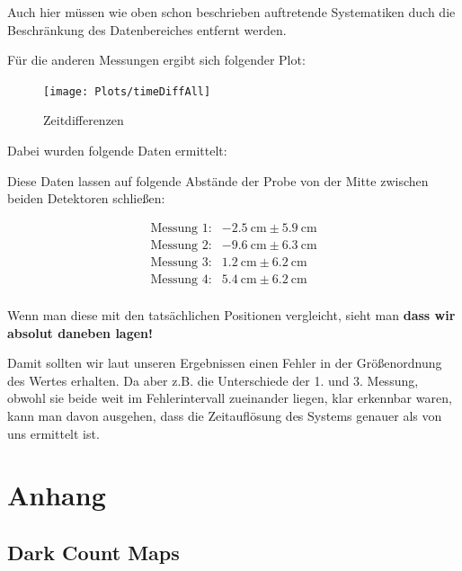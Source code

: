 \documentclass[12pt,twoside,a4paper]{scrartcl}
\begin{document}
					 Auch hier müssen wie oben schon beschrieben auftretende Systematiken duch die Beschränkung des Datenbereiches entfernt werden.

					 Für die anderen Messungen ergibt sich folgender Plot:

					 \begin{figure}[H]
						 \centering
						 \texttt{[image: Plots/timeDiffAll]}
					 	\caption{Zeitdifferenzen}
					 \end{figure}

					 Dabei wurden folgende Daten ermittelt:

					 

					 Diese Daten lassen auf folgende Abstände der Probe von der Mitte zwischen beiden Detektoren schließen:

					 \begin{align*}
					 	\text{Messung 1:}& \SI{-2.5}{\centi \metre} \pm \SI{5.9}{\centi \metre} \\
						\text{Messung 2:}& \SI{-9.6}{\centi \metre} \pm \SI{6.3}{\centi \metre} \\
						\text{Messung 3:}& \SI{1.2}{\centi \metre} \pm \SI{6.2}{\centi \metre} \\
						\text{Messung 4:}& \SI{5.4}{\centi \metre} \pm \SI{6.2}{\centi \metre} \\
					 \end{align*}

					 Wenn man diese mit den tatsächlichen Positionen vergleicht, sieht man \textbf{dass wir absolut daneben lagen!}

					 Damit sollten wir laut unseren Ergebnissen einen Fehler in der Größenordnung des Wertes erhalten. Da aber z.B. die Unterschiede der 1. und 3. Messung, obwohl sie beide weit im Fehlerintervall zueinander liegen, klar erkennbar waren, kann man davon ausgehen, dass die Zeitauflösung des Systems genauer als von uns ermittelt ist.

		\newpage


		\section{Anhang}

			\subsection{Dark Count Maps}
\end{document}
